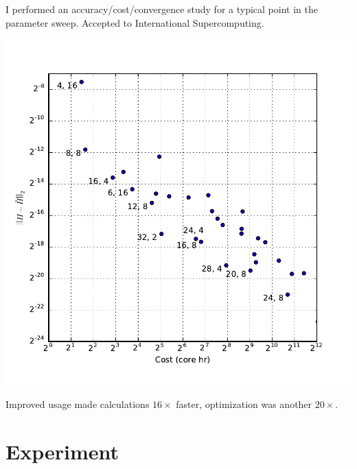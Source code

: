 \documentclass[12pt]{beamer}
\begin{document}
\begin{frame}
I performed an accuracy/cost/convergence study for a typical point in the parameter sweep.
Accepted to International Supercomputing.
\begin{center}
\vspace{-10pt}
\includegraphics[height=0.75\textheight]{graphics/mira_H.pdf}
\end{center}
\vspace{-20pt}
Improved usage made calculations $16\times$ faster, optimization was another $20\times$.
\end{frame}

\section{Experiment}
\end{document}
